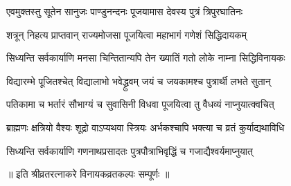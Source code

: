 \twolineshloka
{एवमुक्तस्तु सूतेन सानुजः पाण्डुनन्दनः}
{पूजयामास देवस्य पुत्रं त्रिपुरघातिनः} %

\twolineshloka
{शत्रून् निहत्य प्राप्तवान् राज्यमोजसा}
{पूजयित्वा महाभागं गणेशं सिद्धिदायकम्} %

\twolineshloka
{सिध्यन्ति सर्वकार्याणि मनसा चिन्तितान्यपि}
{तेन ख्यातिं गतो लोके नाम्ना सिद्धिविनायकः} %

\twolineshloka
{विद्यारम्भे पूजितश्चेत् विद्यालाभो भवेद्ध्रुवम्}
{जयं च जयकामश्च पुत्रार्थी लभते सुतान्} %

\twolineshloka
{पतिकामा च भर्तारं सौभाग्यं च सुवासिनी}
{विधवा पूजयित्वा तु वैधव्यं नाप्नुयात्क्वचित्} %

\twolineshloka
{ब्राह्मणः क्षत्रियो वैश्यः शूद्रो वाऽप्यथवा स्त्रियः}
{अर्भकश्चापि भक्त्या च व्रतं कुर्याद्यथाविधि} %

\twolineshloka
{सिध्यन्ति सर्वकार्याणि गणनाथप्रसादतः}
{पुत्रपौत्राभिवृद्धिं च गजाद्यैश्वर्यमाप्नुयात्} %

॥ इति श्रीव्रतरत्नाकरे विनायकव्रतकल्पः सम्पूर्णः ॥
